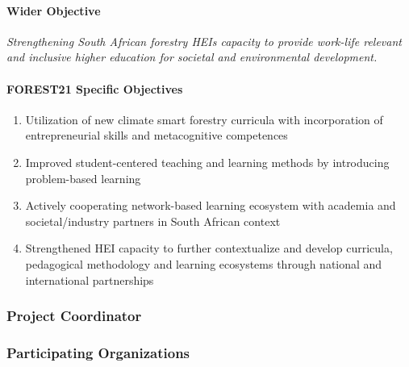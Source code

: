\documentclass[
  11pt,
]{article}
\begin{document}
\hypertarget{wider-objective}{%
\paragraph{Wider Objective}\label{wider-objective}}

\emph{Strengthening South African forestry HEIs capacity to provide
work-life relevant and inclusive higher education for societal and
environmental development.}

\hypertarget{forest21-specific-objectives}{%
\paragraph{FOREST21 Specific
Objectives}\label{forest21-specific-objectives}}

\begin{enumerate}
\def\labelenumi{\arabic{enumi}.}
\item
  Utilization of new climate smart forestry curricula with incorporation
  of entrepreneurial skills and metacognitive competences
\item
  Improved student-centered teaching and learning methods by introducing
  problem-based learning
\item
  Actively cooperating network-based learning ecosystem with academia
  and societal/industry partners in South African context
\item
  Strengthened HEI capacity to further contextualize and develop
  curricula, pedagogical methodology and learning ecosystems through
  national and international partnerships
\end{enumerate}

\hypertarget{project-coordinator}{%
\subsubsection{Project Coordinator}\label{project-coordinator}}

\hypertarget{participating-organizations}{%
\subsubsection{Participating
Organizations}\label{participating-organizations}}

\providecommand{\docline}[3]{\noalign{\global\setlength{\arrayrulewidth}{#1}}\arrayrulecolor[HTML]{#2}\cline{#3}}

\setlength{\tabcolsep}{2pt}

\renewcommand*{\arraystretch}{1.5}
\end{document}
